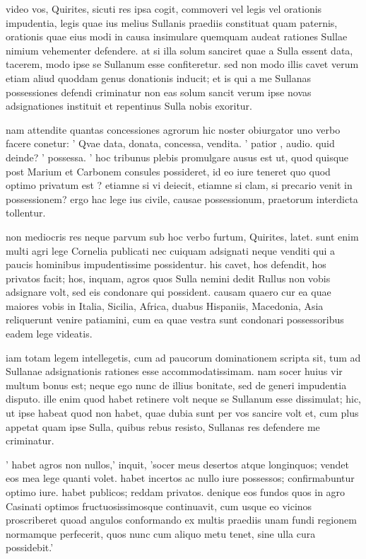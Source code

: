  video vos, Quirites, sicuti res ipsa cogit, commoveri vel legis vel orationis impudentia, legis quae ius melius Sullanis praediis constituat quam paternis, orationis quae eius modi in causa insimulare quemquam audeat rationes Sullae nimium vehementer defendere. at si illa solum sanciret quae a Sulla essent data, tacerem, modo ipse se Sullanum esse confiteretur. sed non modo illis cavet verum etiam aliud quoddam genus donationis inducit; et is qui a me Sullanas possessiones defendi criminatur non eas solum sancit verum ipse novas adsignationes instituit et repentinus Sulla nobis exoritur.

 nam attendite quantas concessiones agrorum hic noster obiurgator uno verbo facere conetur: ' Qvae data, donata, concessa, vendita. ' patior , audio. quid deinde? ' possessa. ' hoc tribunus plebis promulgare ausus est ut, quod quisque post Marium et Carbonem consules possideret, id eo iure teneret quo quod optimo privatum est ? etiamne si vi deiecit, etiamne si clam, si precario venit in possessionem? ergo hac lege ius civile, causae possessionum, praetorum interdicta tollentur.

 non mediocris res neque parvum sub hoc verbo furtum, Quirites, latet. sunt enim multi agri lege Cornelia publicati nec cuiquam adsignati neque venditi qui a paucis hominibus impudentissime possidentur. his cavet, hos defendit, hos privatos facit; hos, inquam, agros quos Sulla nemini dedit Rullus non vobis adsignare volt, sed eis condonare qui possident. causam quaero cur ea quae maiores vobis in Italia, Sicilia, Africa, duabus Hispaniis, Macedonia, Asia reliquerunt venire patiamini, cum ea quae vestra sunt condonari possessoribus eadem lege videatis.

 iam totam legem intellegetis, cum ad paucorum dominationem scripta sit, tum ad Sullanae adsignationis rationes esse accommodatissimam. nam socer huius vir multum bonus est; neque ego nunc de illius bonitate, sed de generi impudentia disputo. ille enim quod habet retinere volt neque se Sullanum esse dissimulat; hic, ut ipse habeat quod non habet, quae dubia sunt per vos sancire volt et, cum plus appetat quam ipse Sulla, quibus rebus resisto, Sullanas res defendere me criminatur.

 ' habet agros non nullos,' inquit, 'socer meus desertos atque longinquos; vendet eos mea lege quanti volet. habet incertos ac nullo iure possessos; confirmabuntur optimo iure. habet publicos; reddam privatos. denique eos fundos quos in agro Casinati optimos fructuosissimosque continuavit, cum usque eo vicinos proscriberet quoad angulos conformando ex multis praediis unam fundi regionem normamque perfecerit, quos nunc cum aliquo metu tenet, sine ulla cura possidebit.'

